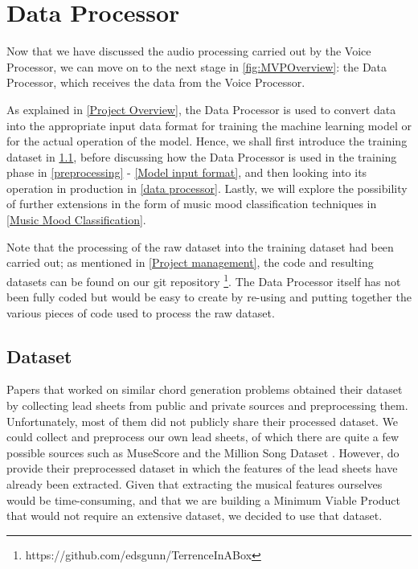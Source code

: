 
\chapter{Data Processor} %

\label{Chapter3} %

Now that we have discussed the audio processing carried out by the Voice Processor, we can move on to the next stage in \cref{fig:MVPOverview}: the Data Processor, which receives the data from the Voice Processor.

As explained in \cref{Project Overview}, the Data Processor is used to convert data into the appropriate input data format for training the machine learning model or for the actual operation of the model. Hence, we shall first introduce the training dataset in \cref{Intro to Dataset}, before discussing how the Data Processor is used in the training phase in \cref{preprocessing} - \cref{Model input format}, and then looking into its operation in production in \cref{data processor}. Lastly, we will explore the possibility of further extensions in the form of music mood classification techniques in \cref{Music Mood Classification}.

Note that the processing of the raw dataset into the training dataset had been carried out; as mentioned in \cref{Project management}, the code and resulting datasets can be found on our git repository \footnote{https://github.com/edsgunn/TerrenceInABox}. The Data Processor itself has not been fully coded but would be easy to create by re-using and putting together the various pieces of code used to process the raw dataset.

\section{Dataset}
\label{Intro to Dataset}
Papers that worked on similar chord generation problems \cite{MySong} \cite{BLSTM} \cite{MLForChords} obtained their dataset by collecting lead sheets from public and private sources and preprocessing them. Unfortunately, most of them did not publicly share their processed dataset. We could collect and preprocess our own lead sheets, of which there are quite a few possible sources such as MuseScore and the Million Song Dataset \cite{Bertin-Mahieux2011}. However, \cite{BLSTM} do provide their preprocessed dataset in which the features of the lead sheets have already been extracted. Given that extracting the musical features ourselves would be time-consuming, and that we are building a Minimum Viable Product that would not require an extensive dataset, we decided to use that dataset.

